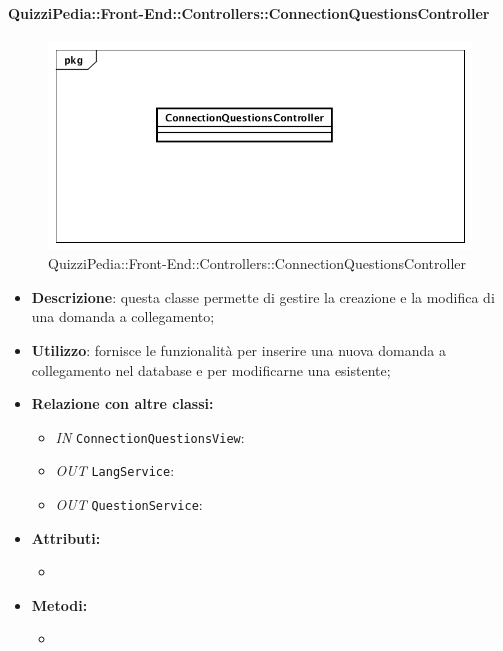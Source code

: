 \paragraph{QuizziPedia::Front-End::Controllers::ConnectionQuestionsController}
\begin{figure}
	\centering
	\includegraphics[scale=0.45]{UML/Classi/Front-End/QuizziPedia_Front-end_Controller_ConnectionQuestionsController.png}
	\caption{QuizziPedia::Front-End::Controllers::ConnectionQuestionsController}
\end{figure}
\begin{itemize}
	\item \textbf{Descrizione}: questa classe permette di gestire la creazione e la modifica di una domanda a collegamento;
	\item \textbf{Utilizzo}: fornisce le funzionalità per inserire una nuova domanda a collegamento nel database e per modificarne una esistente;
	\item \textbf{Relazione con altre classi:}
	\begin{itemize}
		\item \textit{IN} \texttt{ConnectionQuestionsView}:  
		\item \textit{OUT} \texttt{LangService}: 
		\item \textit{OUT} \texttt{QuestionService}:
	\end{itemize}
	\item \textbf{Attributi:}
	\begin{itemize}
		\item 
	\end{itemize}
	\item \textbf{Metodi:}
	\begin{itemize}
		\item 
	\end{itemize}
\end{itemize}

